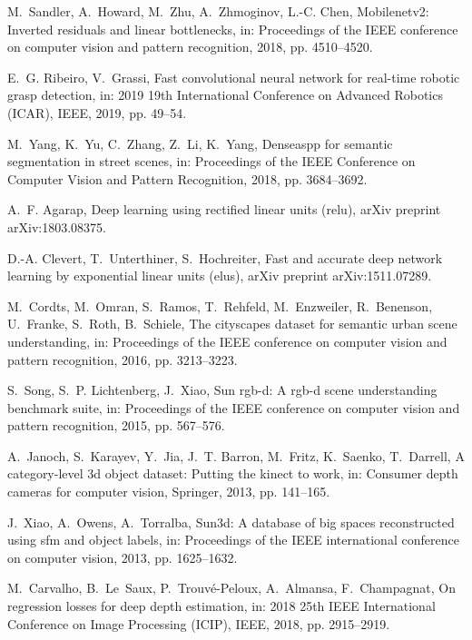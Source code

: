 \documentclass[5p]{elsarticle}
\begin{document}
\begin{thebibliography}{100}
M.~Sandler, A.~Howard, M.~Zhu, A.~Zhmoginov, L.-C. Chen, Mobilenetv2: Inverted
  residuals and linear bottlenecks, in: Proceedings of the IEEE conference on
  computer vision and pattern recognition, 2018, pp. 4510--4520.

E.~G. Ribeiro, V.~Grassi, Fast convolutional neural network for real-time
  robotic grasp detection, in: 2019 19th International Conference on Advanced
  Robotics (ICAR), IEEE, 2019, pp. 49--54.

M.~Yang, K.~Yu, C.~Zhang, Z.~Li, K.~Yang, Denseaspp for semantic segmentation
  in street scenes, in: Proceedings of the IEEE Conference on Computer Vision
  and Pattern Recognition, 2018, pp. 3684--3692.

A.~F. Agarap, Deep learning using rectified linear units (relu), arXiv preprint
  arXiv:1803.08375.

D.-A. Clevert, T.~Unterthiner, S.~Hochreiter, Fast and accurate deep network
  learning by exponential linear units (elus), arXiv preprint arXiv:1511.07289.

M.~Cordts, M.~Omran, S.~Ramos, T.~Rehfeld, M.~Enzweiler, R.~Benenson,
  U.~Franke, S.~Roth, B.~Schiele, The cityscapes dataset for semantic urban
  scene understanding, in: Proceedings of the IEEE conference on computer
  vision and pattern recognition, 2016, pp. 3213--3223.

S.~Song, S.~P. Lichtenberg, J.~Xiao, Sun rgb-d: A rgb-d scene understanding
  benchmark suite, in: Proceedings of the IEEE conference on computer vision
  and pattern recognition, 2015, pp. 567--576.

A.~Janoch, S.~Karayev, Y.~Jia, J.~T. Barron, M.~Fritz, K.~Saenko, T.~Darrell, A
  category-level 3d object dataset: Putting the kinect to work, in: Consumer
  depth cameras for computer vision, Springer, 2013, pp. 141--165.

J.~Xiao, A.~Owens, A.~Torralba, Sun3d: A database of big spaces reconstructed
  using sfm and object labels, in: Proceedings of the IEEE international
  conference on computer vision, 2013, pp. 1625--1632.

M.~Carvalho, B.~Le~Saux, P.~Trouv{\'e}-Peloux, A.~Almansa, F.~Champagnat, On
  regression losses for deep depth estimation, in: 2018 25th IEEE International
  Conference on Image Processing (ICIP), IEEE, 2018, pp. 2915--2919.


\end{thebibliography}
\end{document}

